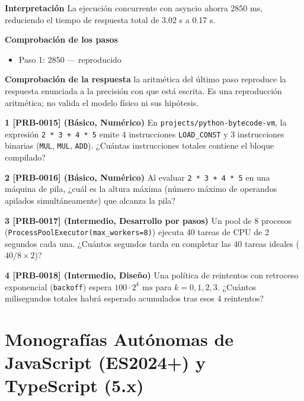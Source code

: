 \documentclass{book}
\begin{document}
\begin{tcolorbox}[title={Problema resuelto}, studiumworked, breakable]
\noindent\textbf{Interpretación}
La ejecución concurrente con asyncio ahorra 2850 ms, reduciendo el tiempo de respuesta total de 3.02 s a 0.17 s.

\noindent\textbf{Comprobación de los pasos}
\begin{itemize}
\item Paso 1: $2850$ — reproducido
\end{itemize}

\noindent\textbf{Comprobación de la respuesta} la aritmética del último paso reproduce la respuesta enunciada a la precisión con que está escrita. Es una reproducción aritmética; no valida el modelo físico ni sus hipótesis.
\end{tcolorbox}

\begin{tcolorbox}[title={Ejercicios}, studiumworked, breakable]

\noindent\textbf{1 [PRB-0015] (Básico, Numérico)}
En \texttt{projects/python-bytecode-vm}, la expresión \texttt{2 * 3 + 4 * 5} emite 4 instrucciones \texttt{LOAD\_CONST} y 3 instrucciones binarias (\texttt{MUL}, \texttt{MUL}, \texttt{ADD}). ¿Cuántas instrucciones totales contiene el bloque compilado?

\noindent\textbf{2 [PRB-0016] (Básico, Numérico)}
Al evaluar \texttt{2 * 3 + 4 * 5} en una máquina de pila, ¿cuál es la altura máxima (número máximo de operandos apilados simultáneamente) que alcanza la pila?

\noindent\textbf{3 [PRB-0017] (Intermedio, Desarrollo por pasos)}
Un pool de 8 procesos (\texttt{ProcessPoolExecutor(max\_workers=8)}) ejecuta 40 tareas de CPU de 2 segundos cada una. ¿Cuántos segundos tarda en completar las 40 tareas ideales (\(40 / 8 \times 2\))?

\noindent\textbf{4 [PRB-0018] (Intermedio, Diseño)}
Una política de reintentos con retroceso exponencial (\texttt{backoff}) espera \(100 \cdot 2^k\text{ ms}\) para \(k = 0, 1, 2, 3\). ¿Cuántos milisegundos totales habrá esperado acumulados tras esos 4 reintentos?
\end{tcolorbox}

\part{Monografías Autónomas de JavaScript (ES2024+) y TypeScript (5.x)}
\end{document}
